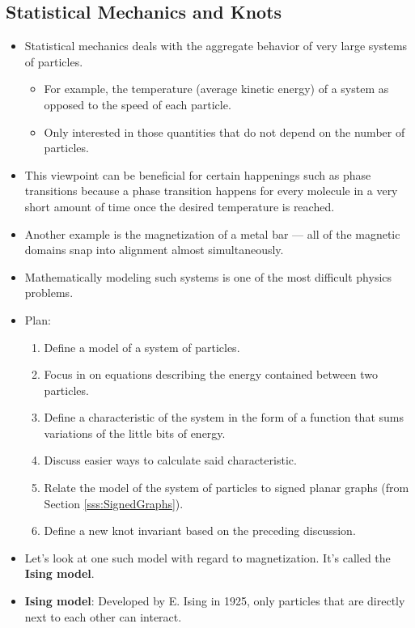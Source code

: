 \documentclass[titlepage]{article}
\numberwithin{figure}{section}
\numberwithin{table}{section}
\numberwithin{equation}{section}
\begin{document}
\subsection{Statistical Mechanics and Knots}\label{sss:StatisticalMechanics}
\begin{itemize}
    \item Statistical mechanics deals with the aggregate behavior of very large systems of particles.
    \begin{itemize}
        \item For example, the temperature (average kinetic energy) of a system as opposed to the speed of each particle.
        \item Only interested in those quantities that do not depend on the number of particles.
    \end{itemize}
    \item This viewpoint can be beneficial for certain happenings such as phase transitions because a phase transition happens for every molecule in a very short amount of time once the desired temperature is reached.
    \item Another example is the magnetization of a metal bar --- all of the magnetic domains snap into alignment almost simultaneously.
    \item Mathematically modeling such systems is one of the most difficult physics problems.
    \item Plan:
    \begin{enumerate}
        \item Define a model of a system of particles.
        \item Focus in on equations describing the energy contained between two particles.
        \item Define a characteristic of the system in the form of a function that sums variations of the little bits of energy.
        \item Discuss easier ways to calculate said characteristic.
        \item Relate the model of the system of particles to signed planar graphs (from Section \ref{sss:SignedGraphs}).
        \item Define a new knot invariant based on the preceding discussion.
    \end{enumerate}
    \item Let's look at one such model with regard to magnetization. It's called the \textbf{Ising model}.
    \item \textbf{Ising model}: Developed by E. Ising in 1925, only particles that are directly next to each other can interact.

\end{itemize}
\end{document}
